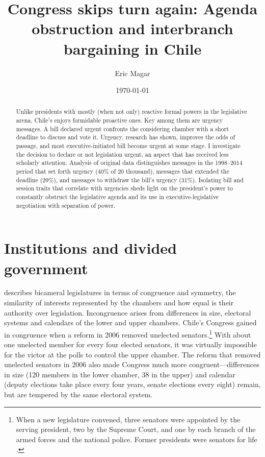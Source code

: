 \documentclass[letter,12pt]{article}
\begin{document}
\title{Congress skips turn again: Agenda obstruction and interbranch bargaining in Chile}
\author{Eric Magar}
\date{\today}
\maketitle

\begin{abstract}
Unlike presidents with mostly (when not only) reactive formal powers in the legislative arena, Chile's enjoys formidable proactive ones. Key among them are urgency messages. A bill declared urgent confronts the considering chamber with a short deadline to discuss and vote it. Urgency, research has shown, improves the odds of passage, and most executive-initiated bill become urgent at some stage. I investigate the decision to declare or not legislation urgent, an aspect that has received less scholarly attention. Analysis of original data distinguishes messages in the 1998--2014 period that set forth urgency (40\% of 20 thousand), messages that extended the deadline (29\%), and messages to withdraw the bill's urgency (31\%). Isolating bill and session traits that correlate with urgencies sheds light on the president's power to constantly obstruct the legislative agenda and its use in executive-legislative negotiation with separation of power.  
\end{abstract}

\onehalfspacing

\section{Institutions and divided government}

\citet{lijphart.1984} describes bicameral legislatures in terms of congruence and symmetry, the similarity of interests represented by the chambers and how equal is their authority over legislation. Incongruence arises from differences in size, electoral systems and calendars of the lower and upper chambers. Chile's Congress gained in congruence when a reform in 2006 removed unelected senators.\footnote{When a new legislature convened, three senators were appointed by the serving president, two by the Supreme Court, and one by each branch of the armed forces and the national police. Former presidents were senators for life \citep{siavelis.2000,londregan.2000a}.} With about one unelected member for every four elected senators, it was virtually impossible for the victor at the polls to control the upper chamber. The reform that removed unelected senators in 2006 also made Congress much more congruent---differences in size (120 members in the lower chamber, 38 in the upper) and calendar (deputy elections take place every four years, senate elections every eight) remain, but are tempered by the same electoral system. 
\end{document}
